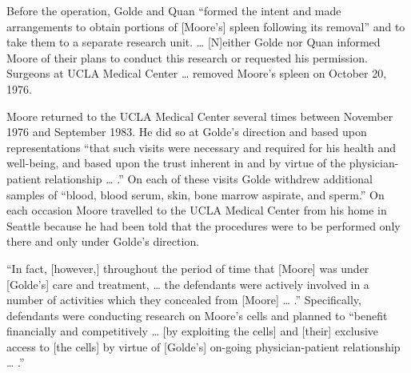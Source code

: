 Before the operation, Golde and Quan ``formed the intent and made arrangements
to obtain portions of [Moore's] spleen following its removal'' and to take them
to a separate research unit. {\dots} [N]either Golde nor Quan informed Moore of
their plans to conduct this research or requested his permission. Surgeons at
UCLA Medical Center {\dots} removed Moore's spleen on October 20, 1976.

Moore returned to the UCLA Medical Center several times between November 1976
and September 1983. He did so at Golde's direction and based upon
representations ``that such visits were necessary and required for his health
and well-being, and based upon the trust inherent in and by virtue of the
physician-patient relationship {\dots} .'' On each of these visits Golde
withdrew additional samples of ``blood, blood serum, skin, bone marrow
aspirate, and sperm.'' On each occasion Moore travelled to the UCLA Medical
Center from his home in Seattle because he had been told that the procedures
were to be performed only there and only under Golde's direction.

{}``In fact, [however,] throughout the period of time that [Moore] was under
[Golde's] care and treatment,  {\dots}  the defendants were actively involved
in a number of activities which they concealed from [Moore] {\dots} .''
Specifically, defendants were conducting research on Moore's cells and planned
to ``benefit financially and competitively  {\dots}  [by exploiting the cells]
and [their] exclusive access to [the cells] by virtue of [Golde's] on-going
physician-patient relationship {\dots} .''

